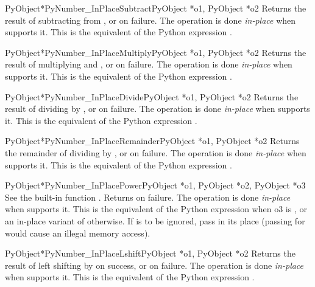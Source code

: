 \documentclass{manual}
\begin{document}
\begin{cfuncdesc}{PyObject*}{PyNumber_InPlaceSubtract}{PyObject *o1, PyObject *o2}
Returns the result of subtracting  from , or
\NULL{} on failure.  The operation is done \emph{in-place} when 
supports it.  This is the equivalent of the Python expression .
\end{cfuncdesc}


\begin{cfuncdesc}{PyObject*}{PyNumber_InPlaceMultiply}{PyObject *o1, PyObject *o2}
Returns the result of multiplying  and , or \NULL{} on
failure.  The operation is done \emph{in-place} when  supports it. 
This is the equivalent of the Python expression .
\end{cfuncdesc}


\begin{cfuncdesc}{PyObject*}{PyNumber_InPlaceDivide}{PyObject *o1, PyObject *o2}
Returns the result of dividing  by , or \NULL{} on failure. 
The operation is done \emph{in-place} when  supports it. This is the
equivalent of the Python expression .
\end{cfuncdesc}


\begin{cfuncdesc}{PyObject*}{PyNumber_InPlaceRemainder}{PyObject *o1, PyObject *o2}
Returns the remainder of dividing  by , or \NULL{} on
failure.  The operation is done \emph{in-place} when  supports it. 
This is the equivalent of the Python expression .
\end{cfuncdesc}


\begin{cfuncdesc}{PyObject*}{PyNumber_InPlacePower}{PyObject *o1, PyObject *o2, PyObject *o3}
See the built-in function .  Returns
\NULL{} on failure.  The operation is done \emph{in-place} when 
supports it.  This is the equivalent of the Python expression  when o3 is , or an in-place variant of
 otherwise. If  is to be
ignored, pass  in its place (passing \NULL{} for 
would cause an illegal memory access).
\end{cfuncdesc}

\begin{cfuncdesc}{PyObject*}{PyNumber_InPlaceLshift}{PyObject *o1, PyObject *o2}
Returns the result of left shifting  by  on success, or
\NULL{} on failure.  The operation is done \emph{in-place} when 
supports it.  This is the equivalent of the Python expression .
\end{cfuncdesc}
\end{document}
